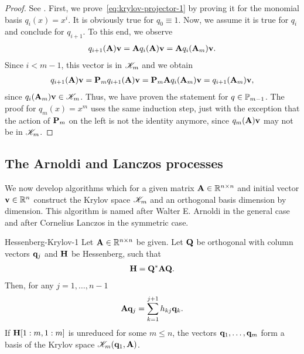 \begin{proof}
  See \cite[Proposition 6.3]{Saad00}.  First, we
  prove~\eqref{eq:krylov-projector-1} by proving it for the monomial
  basis $q_i(x) = x^i$. It is obviously true for $q_0\equiv 1$. Now,
  we assume it is true for $q_i$ and conclude for $q_{i+1}$. To this
  end, we observe
  \begin{gather}
    q_{i+1}(\mata)\vv = \mata q_i(\mata)\vv = \mata q_i(\mata_m)\vv.
  \end{gather}
  Since $i<m-1$, this vector is in $\krylov_m$ and we obtain
  \begin{gather}
    q_{i+1}(\mata)\vv
    = \matp_m q_{i+1}(\mata)\vv
    = \matp_m \mata q_i(\mata_m)\vv
    = q_{i+1}(\mata_m)\vv,
  \end{gather}
  since $q_i(\mata_m)\vv\in\krylov_m$. Thus, we have proven the
  statement for $q\in\P_{m-1}$. The proof for $q_{m}(x) = x^m$ uses
  the same induction step, just with the exception that the action of
  $\matp_m$ on the left is not the identity anymore, since
  $q_m(\mata)\vv$ may not be in $\krylov_m$.
\end{proof}

\subsection{The Arnoldi and Lanczos processes}

\begin{intro}
  We now develop algorithms which for a given matrix $\mata\in\Rnn$
  and initial vector $\vv\in\R^n$ construct the Krylov space
  $\krylov_m$ and an orthogonal basis dimension by dimension. This
  algorithm is named after Walter E. Arnoldi in the general case and
  after Cornelius Lanczos in the symmetric case.
\end{intro}

\begin{Lemma}{Hessenberg-Krylov-1}
  Let $\mata\in\Rnn$ be given. Let $\matq$ be orthogonal with column
  vectors $\vq_j$ and $\matH$ be Hessenberg, such that
  \begin{gather}
    \label{eq:krylov:1}
    \matH = \matq^*\mata\matq.
  \end{gather}
  Then, for any $j=1,\dots,n-1$
  \begin{gather}
    \label{eq:krylov:2}
    \mata\vq_j = \sum_{k=1}^{j+1} h_{kj}\vq_k.
  \end{gather}
  If $\matH[1:m,1:m]$ is unreduced for some $m\le n$, the vectors
  $\vq_1,\dots,\vq_m$ form a basis of the Krylov space
  $\krylov_{m}(\vq_1,\mata)$.
\end{Lemma}

